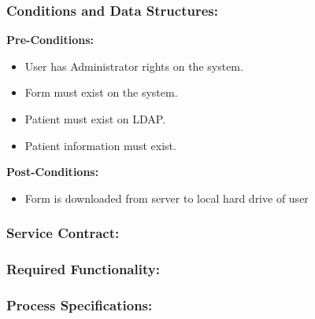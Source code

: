 \subsubsection{Conditions and Data Structures:}
\textbf{Pre-Conditions:}
\begin{itemize}
	\item User has Administrator rights on the system.
	\item Form must exist on the system.
	\item Patient must exist on LDAP.
	\item Patient information must exist.
\end{itemize}

\textbf{Post-Conditions:}	
\begin{itemize}
	\item Form is downloaded from server to local hard drive of user
\end{itemize}
\subsubsection{Service Contract:} 
\subsubsection{Required Functionality:} 
\subsubsection{Process Specifications:} 





